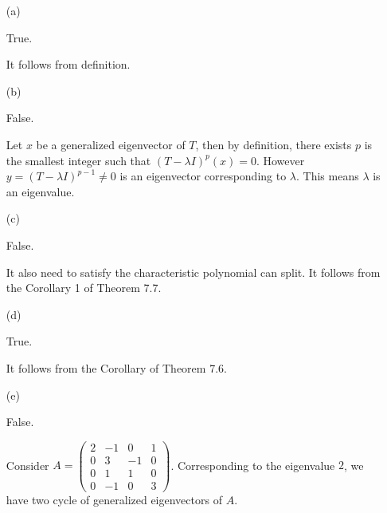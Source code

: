 \begin{Exercise}
	\begin{enumerate}[(a)]
		\item[(a)]
		\begin{answer}
			True.
		\end{answer}
		\begin{solution}
			It follows from definition.
		\end{solution}
		
		\item[(b)]
		\begin{answer}
			False.
		\end{answer}
		\begin{solution}
			Let $x$ be a generalized eigenvector of $T$, then by definition, there exists $p$ is the smallest integer such that $(T-\lambda I)^p(x) = 0$. However $y = (T-\lambda I)^{p-1}\neq 0$ is an eigenvector corresponding to $\lambda$. This means $\lambda$ is an eigenvalue.
		\end{solution}
		
		\item[(c)]
		\begin{answer}
			False.
		\end{answer}
		\begin{solution}
			It also need to satisfy the characteristic polynomial can split. It follows from the Corollary 1 of Theorem 7.7.
		\end{solution}
		
		\item[(d)]
		\begin{answer}
			True.
		\end{answer}
		\begin{solution}
			It follows from the Corollary of Theorem 7.6.
		\end{solution}
		
		\item[(e)]
		\begin{answer}
			False.
		\end{answer}
		\begin{solution}
			Consider $A = \begin{pmatrix}
			2 & -1 & 0 & 1 \\
			0 & 3 & -1 & 0 \\
			0 & 1 & 1 & 0 \\
			0 & -1 & 0 & 3
			\end{pmatrix}$. Corresponding to the eigenvalue $2$, we have two cycle of generalized eigenvectors of $A$.
		\end{solution}
		

\end{enumerate}
\end{Exercise}
